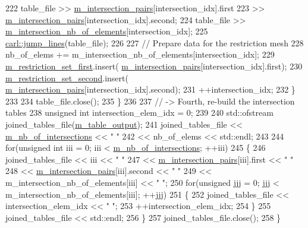 \begin{DoxyCode}
222             table\_file  >> \hyperlink{classcarl_1_1_stitch___meshes_ac2d5619dc617ae411c3c97c130522e29}{m\_intersection\_pairs}[intersection\_idx].first
223                         >> \hyperlink{classcarl_1_1_stitch___meshes_ac2d5619dc617ae411c3c97c130522e29}{m\_intersection\_pairs}[intersection\_idx].second;
224             table\_file  >> \hyperlink{classcarl_1_1_stitch___meshes_a5548b4e0628dcdcb5b1c08eeec124c39}{m\_intersection\_nb\_of\_elements}[intersection\_idx];
225             \hyperlink{namespacecarl_a48bf9a2c641710d703991550fc480884}{carl::jump\_lines}(table\_file);
226 
227             \textcolor{comment}{// Prepare data for the restriction mesh}
228             nb\_of\_elems += m\_intersection\_nb\_of\_elements[intersection\_idx];
229             \hyperlink{classcarl_1_1_stitch___meshes_a60ffa9c7303b4c3833d5a0df2ee5e7f5}{m\_restriction\_set\_first}.insert(
      \hyperlink{classcarl_1_1_stitch___meshes_ac2d5619dc617ae411c3c97c130522e29}{m\_intersection\_pairs}[intersection\_idx].first);
230             \hyperlink{classcarl_1_1_stitch___meshes_acb37d0d65327137309fa5b7815e4b71a}{m\_restriction\_set\_second}.insert(
      \hyperlink{classcarl_1_1_stitch___meshes_ac2d5619dc617ae411c3c97c130522e29}{m\_intersection\_pairs}[intersection\_idx].second);
231             ++intersection\_idx;
232         \}
233 
234         table\_file.close();
235     \}
236 
237     \textcolor{comment}{// -> Fourth, re-build the intersection tables}
238     \textcolor{keywordtype}{unsigned} \textcolor{keywordtype}{int} intersection\_elem\_idx = 0;
239 
240     std::ofstream joined\_tables\_file(\hyperlink{classcarl_1_1_stitch___meshes_a306da20eddb64d29bb1f7b50c4b45a5e}{m\_table\_output});
241     joined\_tables\_file  << \hyperlink{classcarl_1_1_stitch___meshes_a764e63989a934f87105b5f978ec999f1}{m\_nb\_of\_intersections} << \textcolor{stringliteral}{" "}
242                         << nb\_of\_elems << std::endl;
243 
244     \textcolor{keywordflow}{for}(\textcolor{keywordtype}{unsigned} \textcolor{keywordtype}{int} iii = 0; iii < \hyperlink{classcarl_1_1_stitch___meshes_a764e63989a934f87105b5f978ec999f1}{m\_nb\_of\_intersections}; ++iii)
245     \{
246         joined\_tables\_file  << iii << \textcolor{stringliteral}{" "}
247                             << \hyperlink{classcarl_1_1_stitch___meshes_ac2d5619dc617ae411c3c97c130522e29}{m\_intersection\_pairs}[iii].first << \textcolor{stringliteral}{" "}
248                             << \hyperlink{classcarl_1_1_stitch___meshes_ac2d5619dc617ae411c3c97c130522e29}{m\_intersection\_pairs}[iii].second << \textcolor{stringliteral}{" "}
249                             << m\_intersection\_nb\_of\_elements[iii] << \textcolor{stringliteral}{" "};
250         \textcolor{keywordflow}{for}(\textcolor{keywordtype}{unsigned} jjj = 0; jjj < m\_intersection\_nb\_of\_elements[iii]; ++jjj)
251         \{
252             joined\_tables\_file  << intersection\_elem\_idx << \textcolor{stringliteral}{" "};
253             ++intersection\_elem\_idx;
254         \}
255         joined\_tables\_file  << std::endl;
256     \}
257     joined\_tables\_file.close();
258 \}
\end{DoxyCode}

